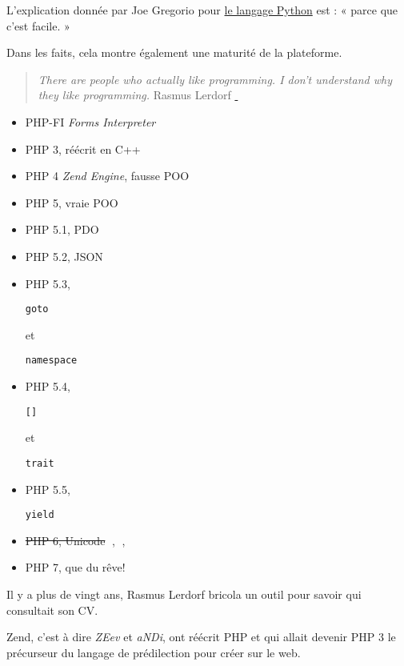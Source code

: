 L'explication donnée par Joe Gregorio pour
\href{http://bitworking.org/news/Why_so_many_Python_web_frameworks}{le
langage Python} est : « parce que c'est facile. »

Dans les faits, cela montre également une maturité de la plateforme.

\begin{quote}
\emph{There are people who actually like programming. I don't understand
why they like programming.} Rasmus Lerdorf
\href{https://en.wikiquote.org/wiki/Rasmus_Lerdorf}{💬}
\end{quote}

\begin{itemize}
\tightlist
\item
  PHP-FI \emph{Forms Interpreter}
\item
  PHP 3, réécrit en C++
\item
  PHP 4 \emph{Zend Engine}, fausse POO
\item
  PHP 5, vraie POO
\item
  PHP 5.1, PDO
\item
  PHP 5.2, JSON
\item
  PHP 5.3,
  \begin{otherlanguage}{english}\texttt{goto}\end{otherlanguage} et
  \begin{otherlanguage}{english}\texttt{namespace}\end{otherlanguage}
\item
  PHP 5.4,
  \begin{otherlanguage}{english}\texttt{{[}{]}}\end{otherlanguage} et
  \begin{otherlanguage}{english}\texttt{trait}\end{otherlanguage}
\item
  PHP 5.5,
  \begin{otherlanguage}{english}\texttt{yield}\end{otherlanguage}
\item
  \sout{PHP 6, Unicode} 💩, 🎃, 🐧
\item
  PHP 7, que du rêve!
\end{itemize}

Il y a plus de vingt ans, Rasmus Lerdorf bricola un outil pour savoir
qui consultait son CV.

Zend, c'est à dire \emph{ZEev} et \emph{aNDi}, ont réécrit PHP et qui
allait devenir PHP 3 le précurseur du langage de prédilection pour créer
sur le web.

